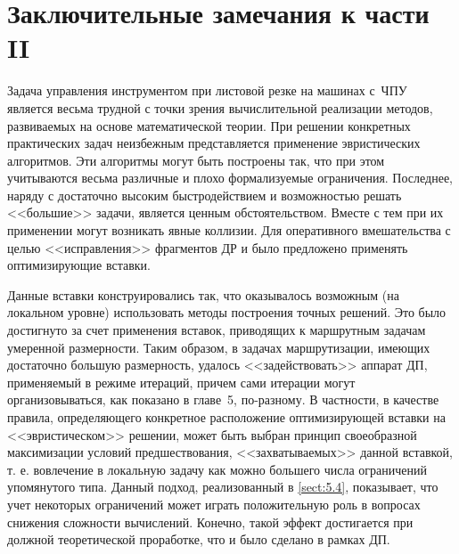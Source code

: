 
\clearpage
\section*{
  Заключительные замечания
  к части II
}

Задача управления инструментом при листовой резке на машинах с~ЧПУ
является весьма трудной с точки зрения вычислительной реализации методов,
развиваемых на основе математической теории.
При решении конкретных практических задач неизбежным
представляется применение эвристических алгоритмов.
Эти алгоритмы могут быть построены так,
что при этом учитываются весьма различные
и плохо формализуемые ограничения.
Последнее, наряду с достаточно высоким
быстродействием и возможностью решать <<большие>> задачи,
является ценным обстоятельством.
Вместе с тем при их применении могут возникать явные коллизии.
Для оперативного
вмешательства с целью <<исправления>> фрагментов ДР
и было предложено применять оптимизирующие вставки.

Данные вставки конструировались так,
что оказывалось возможным
(на локальном уровне)
использовать методы построения точных решений.
Это было достигнуто за счет применения вставок,
приводящих к маршрутным задачам умеренной размерности.
Таким образом, в задачах маршрутизации,
имеющих достаточно большую размерность,
удалось <<задействовать>> аппарат ДП, применяемый в режиме итераций,
причем сами итерации могут организовываться,
как показано в главе~5, по-разному.
В частности, в качестве правила,
определяющего конкретное расположение оптимизирующей вставки на
<<эвристическом>> решении,
может быть выбран принцип своеобразной максимизации условий предшествования,
<<захватываемых>> данной вставкой,
т. е. вовлечение в локальную задачу
как можно большего числа ограничений упомянутого типа.
Данный подход, реализованный
в \ref{sect:5.4},
показывает,
что учет некоторых ограничений может играть положительную роль
в вопросах снижения сложности вычислений.
Конечно, такой эффект достигается при должной
теоретической проработке,
что и было сделано в рамках ДП.


